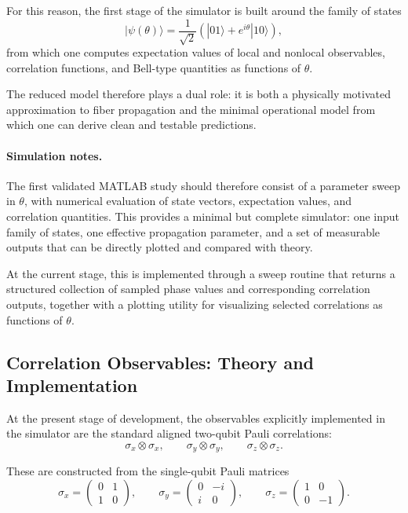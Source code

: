 \documentclass[a4paper]{article}
\begin{document}
For this reason, the first stage of the simulator is built around the family of states
\[
|\psi(\theta)\rangle
=
\frac{1}{\sqrt{2}}
\left(
|01\rangle + e^{i\theta}|10\rangle
\right),
\]
from which one computes expectation values of local and nonlocal observables, correlation functions, and Bell-type quantities as functions of \(\theta\).

The reduced model therefore plays a dual role: it is both a physically motivated approximation to fiber propagation and the minimal operational model from which one can derive clean and testable predictions.

\paragraph{Simulation notes.}
The first validated MATLAB study should therefore consist of a parameter sweep in \(\theta\), with numerical evaluation of state vectors, expectation values, and correlation quantities. This provides a minimal but complete simulator: one input family of states, one effective propagation parameter, and a set of measurable outputs that can be directly plotted and compared with theory.

At the current stage, this is implemented through a sweep routine that returns a structured collection of sampled phase values and corresponding correlation outputs, together with a plotting utility for visualizing selected correlations as functions of \(\theta\).


\subsection{Correlation Observables: Theory and Implementation}

At the present stage of development, the observables explicitly implemented in the simulator are the standard aligned two-qubit Pauli correlations:
\[
\sigma_x \otimes \sigma_x,\qquad
\sigma_y \otimes \sigma_y,\qquad
\sigma_z \otimes \sigma_z.
\]

These are constructed from the single-qubit Pauli matrices
\[
\sigma_x=
\begin{pmatrix}
0 & 1\\
1 & 0
\end{pmatrix},
\qquad
\sigma_y=
\begin{pmatrix}
0 & -i\\
i & 0
\end{pmatrix},
\qquad
\sigma_z=
\begin{pmatrix}
1 & 0\\
0 & -1
\end{pmatrix}.
\]
\end{document}
